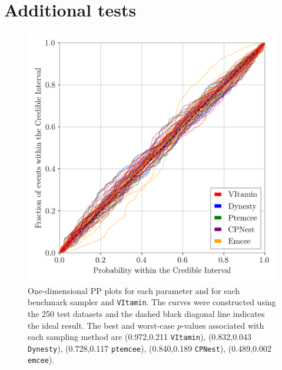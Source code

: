 %
%

\section{Additional tests}
%
%
\begin{figure}
    \includegraphics[width=\columnwidth]{latest_pp_plot.png}
    \caption{\label{fig:pp_plot} One-dimensional \ac{PP} plots for each
parameter and for each benchmark sampler and \texttt{VItamin}. The curves were
constructed using the 250 test datasets and the dashed black diagonal line
indicates the ideal result. The best and worst-case $p$-values associated with each
sampling method are (0.972,0.211 \texttt{VItamin}), (0.832,0.043 \texttt{Dynesty}), (0.728,0.117
\texttt{ptemcee}), (0.840,0.189 \texttt{CPNest}), (0.489,0.002 \texttt{emcee}). 
}
\end{figure}
%

